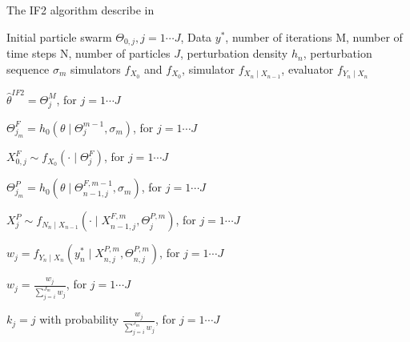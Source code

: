 \documentclass[twoside,openright]{report}
\begin{document}
\begin{algorithm}
  \caption{The IF2 algorithm describe in \cite{ionides2015inference}}\label{alg:IF2_pseudo_code}
  \begin{algorithmic}
    
    \Require Initial particle swarm $\Theta_{0,j} , j = 1 \cdots J$, Data $y^{*}$, number of iterations M, number of time steps N,  number of particles $J$, perturbation density $h_n$, perturbation sequence $\sigma_m$  simulators $f_{X_0}$ and $f_{X_0}$, simulator $f_{X_n \mid X_{n-1}}$, evaluator $f_{Y_n \mid X_n}$
    
    \Ensure $\hat{\theta}^{IF2} = \Theta^M_j$,  for $j = 1 \cdots J$ 
    
    
        
        \State $\Theta^{F}_{j_m} = h_0 (\theta \mid \Theta^{m-1}_{j}, \sigma_m )$, for $j = 1 \cdots J$   
        
        \State $X^{F}_{0,j} \sim f_{X_0}( \cdot \mid \Theta^{F}_j)$, for $j = 1 \cdots J$   
        
        
            
            
            \State $\Theta^{P}_{j_m} = h_0 (\theta \mid \Theta^{F, m-1}_{n-1,j}, \sigma_m )$, for $j = 1 \cdots J$   
            
            \State $X^{P}_{j} \sim f_{N_n \mid X_{n-1}}(\cdot \mid  X^{F,m}_{n-1,j}, \Theta^{P,m}_j )$, for $j = 1 \cdots J$  
            
            \State $w_j = f_{Y_n \mid X_n}(y^{*}_n \mid X^{P,m}_{n,j}, \Theta^{P,m}_{n,j} )$, for $j = 1 \cdots J$  
            
            \State $w_j = \frac{ w_j }{  \sum_{j = i}^{J_m} w_j }$, for $j = 1 \cdots J$   
            
            \State $k_j = j$ with probability $\frac{w_j}{ \sum_{j = i}^{J_m} w_j }$, for $j = 1 \cdots J$   
            

\end{algorithmic}
\end{algorithm}
\end{document}
